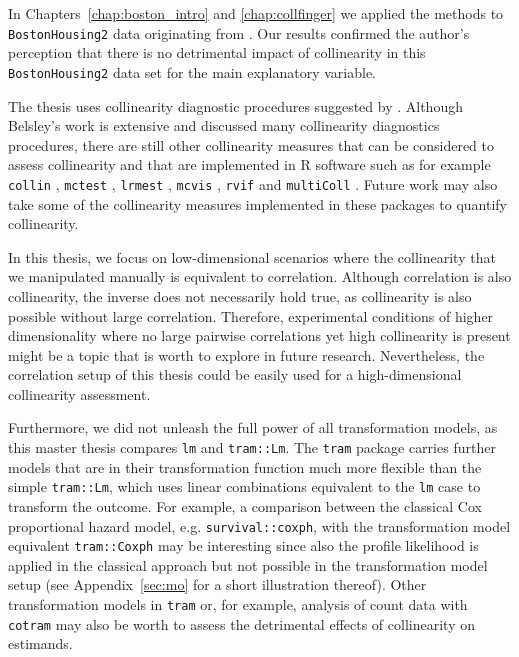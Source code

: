 \documentclass[11pt,a4paper,twoside]{book}\usepackage[]{graphicx}\usepackage[]{xcolor}
\begin{document}
In Chapters~\ref{chap:boston_intro} and \ref{chap:collfinger} we applied the methods to \texttt{BostonHousing2} data originating from \cite{Harrison1978}.
Our results confirmed the author's perception that there is no detrimental impact of collinearity in this \texttt{BostonHousing2} data set for the main explanatory variable.

The thesis uses collinearity diagnostic procedures suggested by \cite{Belsley1991}.
Although Belsley's work is extensive and discussed many collinearity diagnostics procedures, there are still other collinearity measures that can be considered to assess collinearity and that are implemented in \textsf{R} software such as for example \texttt{collin} \citep{collin}, \texttt{mctest} \citep{mctest}, \texttt{lrmest} \citep{lrmest}, \texttt{mcvis} \citep{mcvis},  \texttt{rvif} \citep{rvif} and \texttt{multiColl} \citep{multiColl}.
Future work may also take some of the collinearity measures implemented in these packages to quantify collinearity.

In this thesis, we focus on low-dimensional scenarios where the collinearity that we manipulated manually is equivalent to correlation.
Although correlation is also collinearity, the inverse does not necessarily hold true, as collinearity is also possible without large correlation. 
Therefore, experimental conditions of higher dimensionality where no large pairwise correlations yet high collinearity is present might be a topic that is worth to explore in future research.
Nevertheless, the correlation setup of this thesis could be easily used for a high-dimensional collinearity assessment.

Furthermore, we did not unleash the full power of all transformation models, as this master thesis compares \texttt{lm} and \texttt{tram::Lm}.
The \texttt{tram} \citep{Hothorn2020} package carries further models that are in their transformation function much more flexible than the simple \texttt{tram::Lm}, which uses linear combinations equivalent to the \texttt{lm} case to transform the outcome.
For example, a comparison between the classical Cox proportional hazard model, e.g. \texttt{survival::coxph}, with the transformation model equivalent \texttt{tram::Coxph} may be interesting since also the profile likelihood is applied in the classical approach but not possible in the transformation model setup (see Appendix~\ref{sec:mo} for a short illustration thereof).
Other transformation models in \texttt{tram} or, for example, analysis of count data with \texttt{cotram} \citep{Siegfried2020} may also be worth to assess the detrimental effects of collinearity on estimands.
\end{document}
